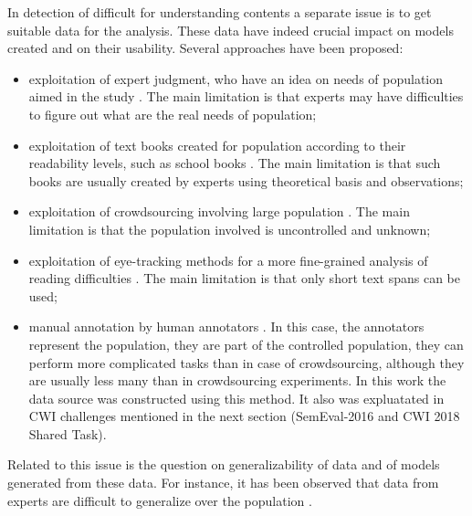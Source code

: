 
In detection of difficult for understanding contents a separate issue is to get suitable data for the analysis. These data have indeed crucial impact on models created and on their usability. Several approaches have been proposed:
\begin{itemize}
\item exploitation of expert judgment, who have an idea on needs of population aimed in the study \citep{DeClerc-NLE2014}. The main limitation is that experts may have difficulties to figure out what are the real needs of population;
\item exploitation of text books created for population according to their readability levels, such as school books \citep{Gala-ELEX2013}. The main limitation is that such books are
  usually created by experts using theoretical basis and observations;
\item exploitation of crowdsourcing involving large population \citep{DeClerc-NLE2014}.  The main limitation is that the population involved is uncontrolled and unknown;
\item exploitation of eye-tracking methods for a more fine-grained
  analysis of reading difficulties \citep{Yaneva-CCA2015,Grabar-ICHI2018}.  The main limitation is that only short text spans can be used;
\item manual annotation by human annotators \citep{Grabar-LREC2016t}. In this case, the annotators represent the population, they are part of the controlled population, they can
  perform more complicated tasks than in case of crowdsourcing, although they are usually less many than in crowdsourcing experiments. In this work the data source was constructed using this method. It also was expluatated in CWI challenges mentioned in the next section (SemEval-2016 and CWI 2018 Shared Task).
\end{itemize}
Related to this issue is the question on generalizability of data and of models generated from these data.  For instance, it has been observed that data from experts are difficult to generalize over the population \citep{DeClerc-NLE2014}.


